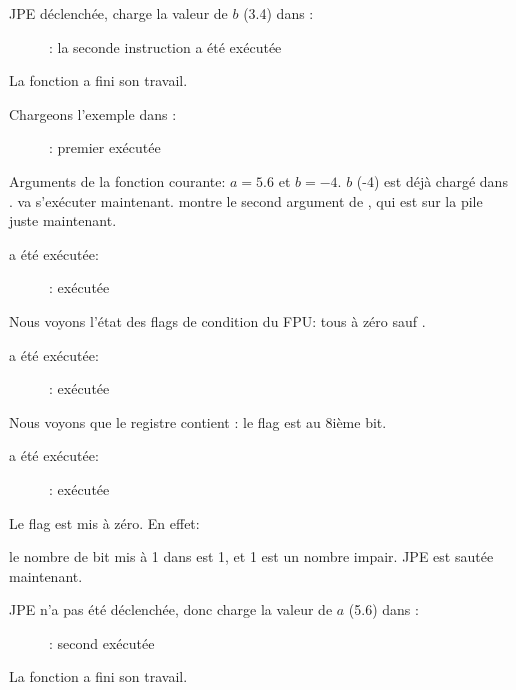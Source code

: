 \clearpage
\ac{JPE} déclenchée, \FLD charge la valeur de $b$ (3.4) dans :

\begin{figure}[H]
\centering
{}
\caption{\olly: la seconde instruction \FLD a été exécutée}
\label{fig:FPU_comparison_case1_olly5}
\end{figure}

La fonction a fini son travail.

\clearpage
{}

Chargeons l'exemple dans \olly:

\begin{figure}[H]
\centering
{}
\caption{\olly: premier \FLD exécutée}
\label{fig:FPU_comparison_case2_olly1}
\end{figure}

Arguments de la fonction courante: $a=5.6$ et $b=-4$.
$b$ (-4) est déjà chargé dans .
\FCOMP va s'exécuter maintenant.
\olly montre le second argument de \FCOMP, qui est sur la pile juste maintenant.

\clearpage
\FCOMP a été exécutée:

\begin{figure}[H]
\centering
{}
\caption{\olly: \FCOMP exécutée}
\label{fig:FPU_comparison_case2_olly2}
\end{figure}

Nous voyons l'état des flags de condition du \ac{FPU}: tous à zéro sauf \Czero.

\clearpage
\FNSTSW a été exécutée:

\begin{figure}[H]
\centering
{}
\caption{\olly: \FNSTSW exécutée}
\label{fig:FPU_comparison_case2_olly3}
\end{figure}

Nous voyons que le registre  contient : le flag \Czero est au 8ième bit.

\clearpage
\TEST a été exécutée:

\begin{figure}[H]
\centering
{}
\caption{\olly: \TEST exécutée}
\label{fig:FPU_comparison_case2_olly4}
\end{figure}

Le flag  est mis à zéro.
En effet:

le nombre de bit mis à 1 dans  est 1, et 1 est un nombre impair.
\ac{JPE} est sautée maintenant.

\clearpage
\ac{JPE} n'a pas été déclenchée, donc \FLD charge la valeur de $a$ (5.6) dans :

\begin{figure}[H]
\centering
{}
\caption{\olly: second \FLD exécutée}
\label{fig:FPU_comparison_case2_olly5}
\end{figure}

La fonction a fini son travail.
